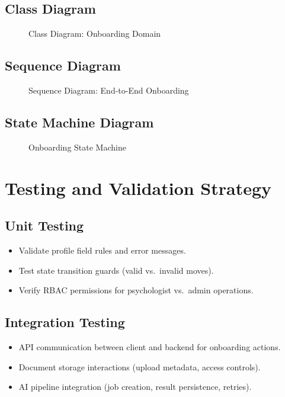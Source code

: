 \subsection{Class Diagram}
\begin{figure}[H]
\centering
{}
\caption{Class Diagram: Onboarding Domain}
\end{figure}

\subsection{Sequence Diagram}
\begin{figure}[H]
\centering
{}
\caption{Sequence Diagram: End-to-End Onboarding}
\end{figure}

\subsection{State Machine Diagram}
\begin{figure}[H]
\centering
{}
\caption{Onboarding State Machine}
\end{figure}

\section{Testing and Validation Strategy}
\label{sec:sprint2-testing}

\subsection{Unit Testing}
\begin{itemize}
    \item Validate profile field rules and error messages.
    \item Test state transition guards (valid vs.\ invalid moves).
    \item Verify RBAC permissions for psychologist vs.\ admin operations.
\end{itemize}

\subsection{Integration Testing}
\begin{itemize}
    \item API communication between client and backend for onboarding actions.
    \item Document storage interactions (upload metadata, access controls).
    \item AI pipeline integration (job creation, result persistence, retries).
\end{itemize}

